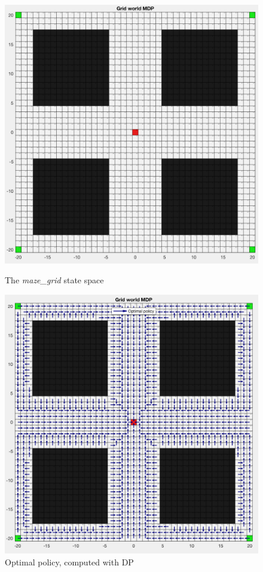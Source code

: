 \documentclass[a4paper]{report}
\begin{document}
{{			\begin{figure}[h!]
				\begin{minipage}{0.5\linewidth}
					\includegraphics[width=\linewidth]{maze_grid}
					\caption{The \emph{maze\_grid} state space}
					\label{fig::maze_display}
				\end{minipage}
				\hfill
				\begin{minipage}{0.5\linewidth}
					\includegraphics[width=\linewidth]{maze_optimal_policy}
					\caption{Optimal policy, computed with DP}
					\label{fig::maze_optimal_policy}
				\end{minipage}
			\end{figure}
				
}}
\end{document}
